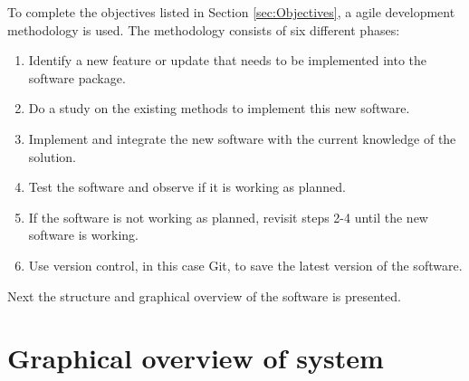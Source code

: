 To complete the objectives listed in Section \ref{sec:Objectives}, a agile development methodology is used. The methodology consists of six different phases:
\begin{enumerate}
\item Identify a new feature or update that needs to be implemented into the software package.
\item Do a study on the existing methods to implement this new software.
\item Implement and integrate the new software with the current knowledge of the solution.
\item Test the software and observe if it is working as planned.
\item If the software is not working as planned, revisit steps 2-4 until the new software is working.
\item Use version control, in this case Git, to save the latest version of the software.
\end{enumerate}


Next the structure and graphical overview of the software is presented.

\section{Graphical overview of system}

